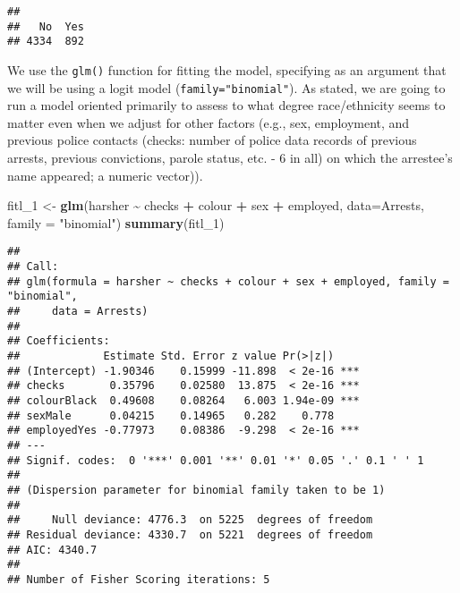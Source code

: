 \documentclass[
]{book}
\newenvironment{Shaded}{\begin{snugshade}}{\end{snugshade}}
\newcommand{\AttributeTok}[1]{\textcolor[rgb]{0.13,0.29,0.53}{#1}}
\newcommand{\CommentTok}[1]{\textcolor[rgb]{0.56,0.35,0.01}{\textit{#1}}}
\newcommand{\FunctionTok}[1]{\textcolor[rgb]{0.13,0.29,0.53}{\textbf{#1}}}
\newcommand{\NormalTok}[1]{#1}
\newcommand{\OtherTok}[1]{\textcolor[rgb]{0.56,0.35,0.01}{#1}}
\newcommand{\SpecialCharTok}[1]{\textcolor[rgb]{0.81,0.36,0.00}{\textbf{#1}}}
\newcommand{\StringTok}[1]{\textcolor[rgb]{0.31,0.60,0.02}{#1}}
\begin{document}
\begin{verbatim}
## 
##   No  Yes 
## 4334  892
\end{verbatim}

\begin{Shaded}
\end{Shaded}

We use the \texttt{glm()} function for fitting the model, specifying as an argument that we will be using a logit model (\texttt{family="binomial"}). As stated, we are going to run a model oriented primarily to assess to what degree race/ethnicity seems to matter even when we adjust for other factors (e.g., sex, employment, and previous police contacts (checks: number of police data records of previous arrests, previous convictions, parole status, etc. - 6 in all) on which the arrestee's name appeared; a numeric vector)).

\begin{Shaded}
\begin{Highlighting}[]
\NormalTok{fitl\_1 }\OtherTok{\textless{}{-}} \FunctionTok{glm}\NormalTok{(harsher }\SpecialCharTok{\textasciitilde{}}\NormalTok{ checks }\SpecialCharTok{+}\NormalTok{ colour }\SpecialCharTok{+}\NormalTok{ sex }\SpecialCharTok{+}\NormalTok{ employed, }\AttributeTok{data=}\NormalTok{Arrests, }\AttributeTok{family =} \StringTok{"binomial"}\NormalTok{)}
\FunctionTok{summary}\NormalTok{(fitl\_1)}
\end{Highlighting}
\end{Shaded}

\begin{verbatim}
## 
## Call:
## glm(formula = harsher ~ checks + colour + sex + employed, family = "binomial", 
##     data = Arrests)
## 
## Coefficients:
##             Estimate Std. Error z value Pr(>|z|)    
## (Intercept) -1.90346    0.15999 -11.898  < 2e-16 ***
## checks       0.35796    0.02580  13.875  < 2e-16 ***
## colourBlack  0.49608    0.08264   6.003 1.94e-09 ***
## sexMale      0.04215    0.14965   0.282    0.778    
## employedYes -0.77973    0.08386  -9.298  < 2e-16 ***
## ---
## Signif. codes:  0 '***' 0.001 '**' 0.01 '*' 0.05 '.' 0.1 ' ' 1
## 
## (Dispersion parameter for binomial family taken to be 1)
## 
##     Null deviance: 4776.3  on 5225  degrees of freedom
## Residual deviance: 4330.7  on 5221  degrees of freedom
## AIC: 4340.7
## 
## Number of Fisher Scoring iterations: 5
\end{verbatim}
\end{document}
